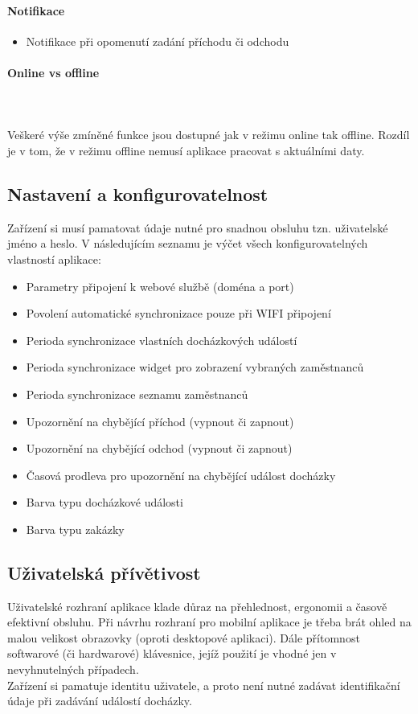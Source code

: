 \documentclass{diplomka}
\begin{document}
\paragraph{Notifikace}
\begin{itemize}[noitemsep,nolistsep]
\item Notifikace při opomenutí zadání příchodu či odchodu
\end{itemize}

\paragraph{Online vs offline}\mbox{}\\ \\ \indent
Veškeré výše zmíněné funkce jsou dostupné jak v režimu online tak offline. Rozdíl je v tom, že v režimu offline nemusí aplikace pracovat s aktuálními daty.

\subsection{Nastavení a konfigurovatelnost}
Zařízení si musí pamatovat údaje nutné pro snadnou obsluhu tzn. uživatelské jméno a heslo. V následujícím seznamu je výčet všech konfigurovatelných vlastností aplikace:

\begin{itemize}[noitemsep,nolistsep]
\item Parametry připojení k webové službě (doména a port)
\item Povolení automatické synchronizace pouze při WIFI připojení
\item Perioda synchronizace vlastních docházkových událostí
\item Perioda synchronizace widget pro zobrazení vybraných zaměstnanců
\item Perioda synchronizace seznamu zaměstnanců
\item Upozornění na chybějící příchod (vypnout či zapnout)
\item Upozornění na chybějící odchod (vypnout či zapnout)
\item Časová prodleva pro upozornění na chybějící událost docházky
\item Barva typu docházkové události
\item Barva typu zakázky
\end{itemize}

\subsection{Uživatelská přívětivost}
Uživatelské rozhraní aplikace klade důraz na přehlednost, ergonomii a časově efektivní obsluhu. Při návrhu rozhraní pro mobilní aplikace je třeba brát ohled na malou velikost obrazovky (oproti desktopové aplikaci). Dále přítomnost softwarové (či hardwarové) klávesnice, jejíž použití je vhodné jen v nevyhnutelných případech.  \\ \indent Zařízení si pamatuje identitu uživatele, a proto není nutné zadávat identifikační údaje při zadávání událostí docházky.
\end{document}
